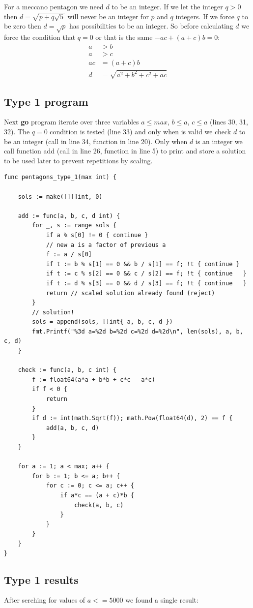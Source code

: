 \documentclass[11pt]{article}
\begin{document}
For a meccano pentagon we need $d$ to be an integer. If we let the integer $q > 0$ then $d = \sqrt{p + q\sqrt{5}}$ will never be an integer for $p$ and $q$ integers. If we force $q$ to be zero then $d = \sqrt{p}$ has possibilities to be an integer.
So before calculating $d$ we force the condition that $q = 0$ or that is the same $-ac + (a+c)b = 0$:
\begin{align*}
a  & > b\\
a  & > c\\
ac &= (a + c)b\\
 d &= \sqrt{a^2 + b^2 + c^2 + ac}
\end{align*}

\subsection{Type 1 program}

Next \textbf{go} program iterate over three variables $a \leq max$, $b \leq a$, $c \leq a$ (lines 30, 31, 32).
The $q = 0$ condition is tested (line 33) and only when is valid we check $d$ to be an integer (call in line 34, function in line 20). Only when $d$ is an integer we call function
add (call in line 26, function in line 5) to print and store a solution 
to be used later to prevent repetitions by scaling.
\begin{lstlisting}
func pentagons_type_1(max int) {

	sols := make([][]int, 0)

	add := func(a, b, c, d int) {
		for _, s := range sols {
			if a % s[0] != 0 { continue }
			// new a is a factor of previous a
			f := a / s[0]
			if t := b % s[1] == 0 && b / s[1] == f; !t { continue }
			if t := c % s[2] == 0 && c / s[2] == f; !t { continue	}
			if t := d % s[3] == 0 && d / s[3] == f; !t { continue	}
			return // scaled solution already found (reject)
		}
		// solution!
		sols = append(sols, []int{ a, b, c, d })
		fmt.Printf("%3d a=%2d b=%2d c=%2d d=%2d\n", len(sols), a, b, c, d)
	}

	check := func(a, b, c int) {
		f := float64(a*a + b*b + c*c - a*c)
		if f < 0 {
			return
		}
		if d := int(math.Sqrt(f)); math.Pow(float64(d), 2) == f {
			add(a, b, c, d)
		}
	}

	for a := 1; a < max; a++ {
		for b := 1; b <= a; b++ {
			for c := 0; c <= a; c++ {
				if a*c == (a + c)*b {
					check(a, b, c)
				}
			}
		}
	}
}
\end{lstlisting}

\subsection{Type 1 results}
After serching for values of $a <= 5000$ we found a single result:
\end{document}
